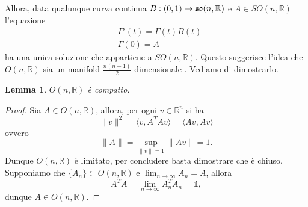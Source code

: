 \documentclass{amsart}
\numberwithin{equation}{section}
\newtheorem{lem}[thm]{Lemma}
\newcommand\bR{{\mathbb R}}
\newcommand\Id{{\mathds{1}}}
\newcommand{\lie}{\frak s\frak o}
\begin{document}
Allora, data qualunque curva continua $B:(0,1)\to \lie(n,\bR)$ e $A\in SO(n,\bR)$ l'equazione
\[
\begin{split}
&\Gamma'(t)=\Gamma(t)B(t)\\
&\Gamma(0)=A
\end{split}
\]
ha una unica soluzione che appartiene a $SO(n,\bR)$. Questo suggerisce l'idea che $O(n,\bR)$ sia un manifold $\frac{n(n-1)}2$ dimensionale . Vediamo di dimostrarlo.
\begin{lem} $O(n,\bR)$ \`e compatto.
\end{lem}
\begin{proof}
Sia $A\in O(n,\bR)$, allora, per ogni $v\in\bR^n$ si ha
\[
\|v\|^2=\langle v, A^TAv\rangle=\langle Av, Av\rangle
\]
ovvero
\[
\|A\|=\sup_{\|v\|=1}\|Av\|=1.
\]
Dunque $ O(n,\bR)$ \`e limitato, per concludere basta dimostrare che \`e chiuso. Supponiamo che $\{A_n\}\subset O(n,\bR)$ e $\lim_{n\to\infty}A_n=A$, allora
\[
A^TA=\lim_{n\to\infty} A_n^TA_n=\Id,
\]
dunque $A\in O(n,\bR)$.
\end{proof}
\end{document}
